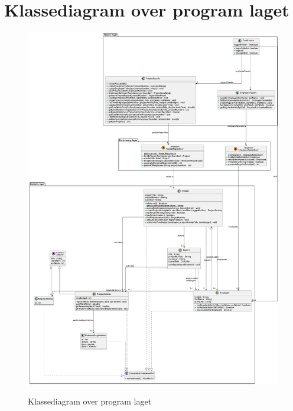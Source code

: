 

\section{Klassediagram over program laget}\label{apdx:classDiagram_full}
\begin{figure}[H]
    \centering
    \caption{Klassediagram over program laget}
    \includegraphics[width = \textwidth, keepaspectratio]{TaskFusion/out/assets/diagrams/class_persistency_full/ClassDiagram_full.png}
    \label{fig:classDiagram_full}
\end{figure}

